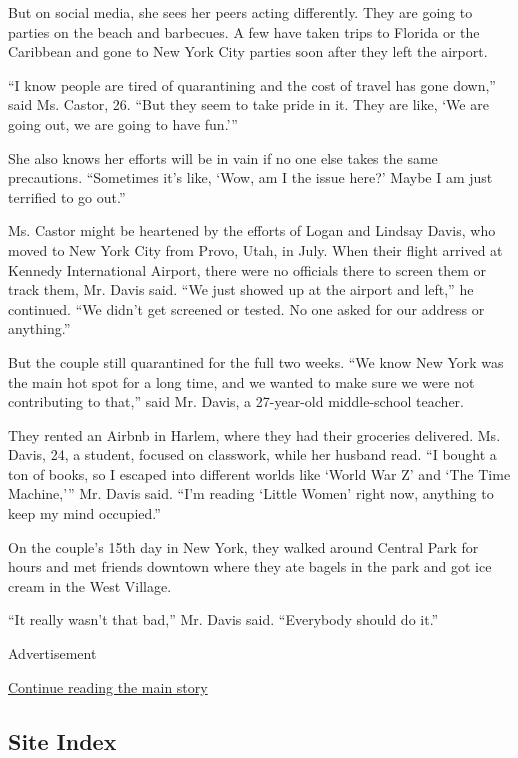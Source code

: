 But on social media, she sees her peers acting differently. They are
going to parties on the beach and barbecues. A few have taken trips to
Florida or the Caribbean and gone to New York City parties soon after
they left the airport.

``I know people are tired of quarantining and the cost of travel has
gone down,'' said Ms. Castor, 26. ``But they seem to take pride in it.
They are like, `We are going out, we are going to have fun.'''

She also knows her efforts will be in vain if no one else takes the same
precautions. ``Sometimes it's like, `Wow, am I the issue here?' Maybe I
am just terrified to go out.''

Ms. Castor might be heartened by the efforts of Logan and Lindsay Davis,
who moved to New York City from Provo, Utah, in July. When their flight
arrived at Kennedy International Airport, there were no officials there
to screen them or track them, Mr. Davis said. ``We just showed up at the
airport and left,'' he continued. ``We didn't get screened or tested. No
one asked for our address or anything.''

But the couple still quarantined for the full two weeks. ``We know New
York was the main hot spot for a long time, and we wanted to make sure
we were not contributing to that,'' said Mr. Davis, a 27-year-old
middle-school teacher.

They rented an Airbnb in Harlem, where they had their groceries
delivered. Ms. Davis, 24, a student, focused on classwork, while her
husband read. ``I bought a ton of books, so I escaped into different
worlds like `World War Z' and `The Time Machine,''' Mr. Davis said.
``I'm reading `Little Women' right now, anything to keep my mind
occupied.''

On the couple's 15th day in New York, they walked around Central Park
for hours and met friends downtown where they ate bagels in the park and
got ice cream in the West Village.

``It really wasn't that bad,'' Mr. Davis said. ``Everybody should do
it.''

Advertisement

\protect\hyperlink{after-bottom}{Continue reading the main story}

\hypertarget{site-index}{%
\subsection{Site Index}\label{site-index}}

